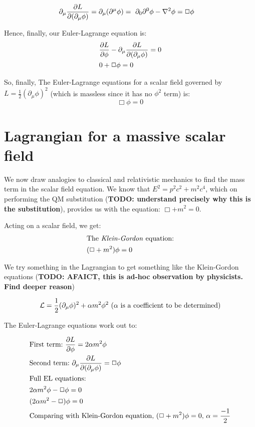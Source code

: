 \begin{align*}
    &\partial_\mu \pdv{L}{(\partial_\mu \phi)} = \partial_\mu (\partial^\mu \phi) 
    =~\partial_0 \partial^0  \phi - \laplacian \phi = \Box \phi
\end{align*}

Hence, finally, our Euler-Lagrange equation is:
\begin{align*}
    &\pdv{L}{\phi} -  \partial_\mu \pdv{L}{(\partial_\mu \phi)} = 0 \\
    &0 + \Box \phi  = 0
\end{align*}

So, finally, The Euler-Lagrange equations for a scalar field governed by $L =
\frac{1}{2} (\partial_\mu \phi)^2$ (which is massless since it has no $\phi^2$
term) is:
\begin{equation}
    \boxed{\Box \phi  = 0}
 \end{equation}
\section{Lagrangian for a massive scalar field}
We now draw analogies to classical and relativistic mechanics to find
the mass term in the scalar field equation. We know that
$E^2 = p^2 c^2 + m^2 c^4$, which on performing the QM substitution
(\textbf{TODO: understand precisely why this is the substitution}), provides
us with the equation:  $\Box + m^2 = 0$.

Acting on a scalar field, we get:
\begin{align*}
    &\text{The \textit{Klein-Gordon} equation:}\\
    &(\Box + m^2) \phi = 0
\end{align*}

We try something in the Lagrangian to get something like the Klein-Gordon
equations (\textbf{TODO: AFAICT, this is ad-hoc observation by physicists. Find deeper reason})

\begin{align*}
    &\mathcal{L} = \frac{1}{2} (\partial_\mu \phi)^2 + \alpha m^2 \phi^2~\text{($\alpha$ is a coefficient to be determined)} \\
\end{align*}

The Euler-Lagrange equations work out to:

\begin{align*}
    &\text{First term:} 
    ~\pdv{L}{\phi} =  2 \alpha m^2 \phi\\
    &\text{Second term:}
    ~\partial_\mu \pdv{L}{(\partial_\mu \phi)} = \Box \phi \\
    &\text{Full EL equations:} \\
    &2 \alpha m^2 \phi - \Box \phi = 0 \\
    &(2 \alpha m^2 - \Box) \phi = 0 \\
    &\text{Comparing with Klein-Gordon equation, $(\Box + m^2) \phi = 0$, $\alpha = \frac{-1}{2}$}
\end{align*}

